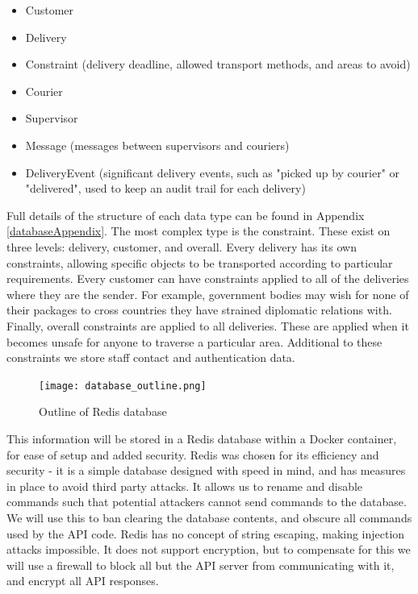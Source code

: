 \begin{itemize}
    \item Customer
    \item Delivery
    \item Constraint (delivery deadline, allowed transport methods, and areas to avoid)
    \item Courier
    \item Supervisor
    \item Message (messages between supervisors and couriers)
    \item DeliveryEvent (significant delivery events, such as "picked up by courier" or "delivered", used to keep an audit trail for each delivery)
\end{itemize}

Full details of the structure of each data type can be found in Appendix \ref{databaseAppendix}. The most complex type is the constraint. These exist on three levels: delivery, customer, and overall. Every delivery has its own constraints, allowing specific objects to be transported according to particular requirements. Every customer can have constraints applied to all of the deliveries where they are the sender. For example, government bodies may wish for none of their packages to cross countries they have strained diplomatic relations with. Finally, overall constraints are applied to all deliveries. These are applied when it becomes unsafe for anyone to traverse a particular area. Additional to these constraints we store staff contact and authentication data.

\begin{figure}[h]
\texttt{[image: database\_outline.png]}
    \centering
    \caption{Outline of Redis database}
    \label{fig:redis_database}
\end{figure}

This information will be stored in a Redis database within a Docker container, for ease of setup and added security. Redis was chosen for its efficiency and security - it is a simple database designed with speed in mind, and has measures in place to avoid third party attacks\cite{redisSecutiry}. It allows us to rename and disable commands such that potential attackers cannot send commands to the database. We will use this to ban clearing the database contents, and obscure all commands used by the API code. Redis has no concept of string escaping, making injection attacks impossible. It does not support encryption, but to compensate for this we will use a firewall to block all but the API server from communicating with it, and encrypt all API responses.

